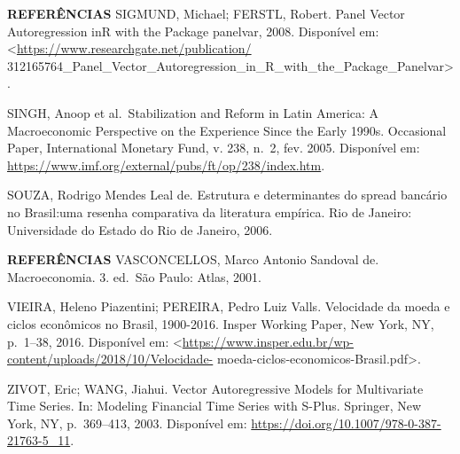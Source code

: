 \documentclass[
  ignorenonframetext,
  aspectratio=169,
  ignorenonframetext]{beamer}
\begin{document}
\begin{frame}{\textbf{REFERÊNCIAS}}
\protect\hypertarget{referuxeancias-21}{}
SIGMUND, Michael; FERSTL, Robert. Panel Vector Autoregression inR with
the Package panelvar, 2008. Disponível em:
\textless{}\url{https://www.researchgate.net/publication/}
312165764\_Panel\_Vector\_Autoregression\_in\_R\_with\_the\_Package\_Panelvar\textgreater.

SINGH, Anoop et al.~Stabilization and Reform in Latin America: A
Macroeconomic Perspective on the Experience Since the Early 1990s.
Occasional Paper, International Monetary Fund, v. 238, n.~2, fev. 2005.
Disponível em:
\url{https://www.imf.org/external/pubs/ft/op/238/index.htm}.

SOUZA, Rodrigo Mendes Leal de. Estrutura e determinantes do spread
bancário no Brasil:uma resenha comparativa da literatura empírica. Rio
de Janeiro: Universidade do Estado do Rio de Janeiro, 2006.
\end{frame}

\begin{frame}{\textbf{REFERÊNCIAS}}
\protect\hypertarget{referuxeancias-22}{}
VASCONCELLOS, Marco Antonio Sandoval de. Macroeconomia. 3. ed.~São
Paulo: Atlas, 2001.

VIEIRA, Heleno Piazentini; PEREIRA, Pedro Luiz Valls. Velocidade da
moeda e ciclos econômicos no Brasil, 1900-2016. Insper Working Paper,
New York, NY, p.~1--38, 2016. Disponível em:
\textless{}\url{https://www.insper.edu.br/wp-content/uploads/2018/10/Velocidade-}
moeda-ciclos-economicos-Brasil.pdf\textgreater.

ZIVOT, Eric; WANG, Jiahui. Vector Autoregressive Models for Multivariate
Time Series. In: Modeling Financial Time Series with S-Plus. Springer,
New York, NY, p.~369--413, 2003. Disponível em:
\url{https://doi.org/10.1007/978-0-387-21763-5_11}.
\end{frame}
\end{document}
